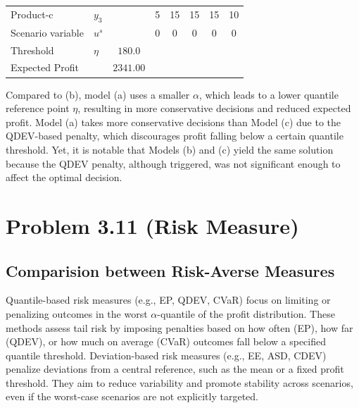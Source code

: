 \documentclass[7pt]{article}
\begin{document}
\begin{table}[h!]
\begin{tabular}{ll|c|ccccc}
        Product-c             & $y_3$                                      &                 & 5            & 15                & 15            & 15               & 10            \\
        Scenario variable     & $u^s$                                      &                 & 0            & 0                 & 0             & 0                & 0             \\
        Threshold             & $\eta$                                     & $180.0$         &                                                                                     \\
        Expected Profit       &                                            & $2341.00$       &                                                                                     \\
        \bottomrule
    \end{tabular}
\end{table}

Compared to (b), model (a) uses a smaller $\alpha$, which leads to a lower
quantile reference point $\eta$, resulting in more conservative decisions and
reduced expected profit. Model (a) takes more conservative decisions than Model
(c) due to the QDEV-based penalty, which discourages profit falling below a
certain quantile threshold. Yet, it is notable that Models (b) and (c) yield
the same solution because the QDEV penalty, although triggered, was not
significant enough to affect the optimal decision.

\section{Problem 3.11 (Risk Measure)}

\subsection{Comparision between Risk-Averse Measures}
Quantile-based risk measures (e.g., EP, QDEV, CVaR) focus on limiting or
penalizing outcomes in the worst $\alpha$-quantile of the profit distribution.
These methods assess tail risk by imposing penalties based on how often (EP),
how far (QDEV), or how much on average (CVaR) outcomes fall below a specified
quantile threshold. Deviation-based risk measures (e.g., EE, ASD, CDEV)
penalize deviations from a central reference, such as the mean or a fixed
profit threshold. They aim to reduce variability and promote stability across
scenarios, even if the worst-case scenarios are not explicitly targeted.
\end{document}
